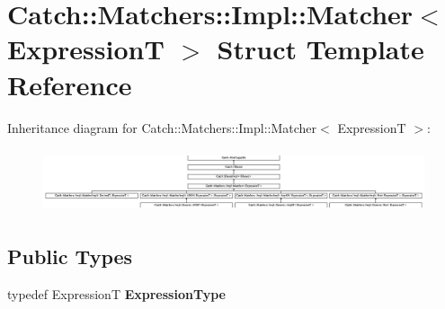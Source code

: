 \hypertarget{structCatch_1_1Matchers_1_1Impl_1_1Matcher}{}\section{Catch\+:\+:Matchers\+:\+:Impl\+:\+:Matcher$<$ ExpressionT $>$ Struct Template Reference}
\label{structCatch_1_1Matchers_1_1Impl_1_1Matcher}
Inheritance diagram for Catch\+:\+:Matchers\+:\+:Impl\+:\+:Matcher$<$ ExpressionT $>$\+:\begin{figure}[H]
\begin{center}
\leavevmode
\includegraphics[height=1.879195cm]{structCatch_1_1Matchers_1_1Impl_1_1Matcher}
\end{center}
\end{figure}
\subsection*{Public Types}
\begin{DoxyCompactItemize}
\item 
typedef ExpressionT {\bfseries Expression\+Type}\hypertarget{structCatch_1_1Matchers_1_1Impl_1_1Matcher_a7f5068cbacd1eed06cf243e63446e7e1}{}\label{structCatch_1_1Matchers_1_1Impl_1_1Matcher_a7f5068cbacd1eed06cf243e63446e7e1}

\end{DoxyCompactItemize}

